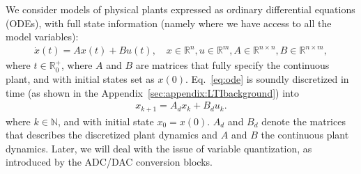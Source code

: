 \documentclass[runningheads,a4paper]{llncs}
\begin{document}
We consider models of physical plants expressed as ordinary differential equations (ODEs), 
with full state information (namely where we have access to all the model variables):  
%
\begin{align}
\label{eq:ode}
\dot{x}(t) = Ax(t)+ B u(t), \quad x \in \mathbb{R}^{n}, u \in \mathbb{R}^m, A \in \mathbb{R}^{n \times n}, B \in \mathbb{R}^{n \times m}, 
\end{align}
where $t \in \mathbb R_0^+$, 
where $A$ and $B$ are matrices that fully specify the continuous plant, 
and with initial states set as $x(0)$. 
Eq.~\eqref{eq:ode} is soundly discretized in time (as shown in the Appendix~\ref{sec:appendix:LTIbackground}) into %
%
\begin{align}
\label{eq:plant}
x_{k+1} = A_d x_k+ B_d u_k. 
\end{align} 
where $k \in \mathbb N$, 
and with initial state $x_{0}=x(0)$. $A_d$ and $B_d$ denote the matrices that describes the discretized plant dynamics and $A$ and $B$ the continuous plant dynamics. 
Later, we will deal with the issue of variable quantization, as introduced by the ADC/DAC conversion blocks.  
\end{document}
